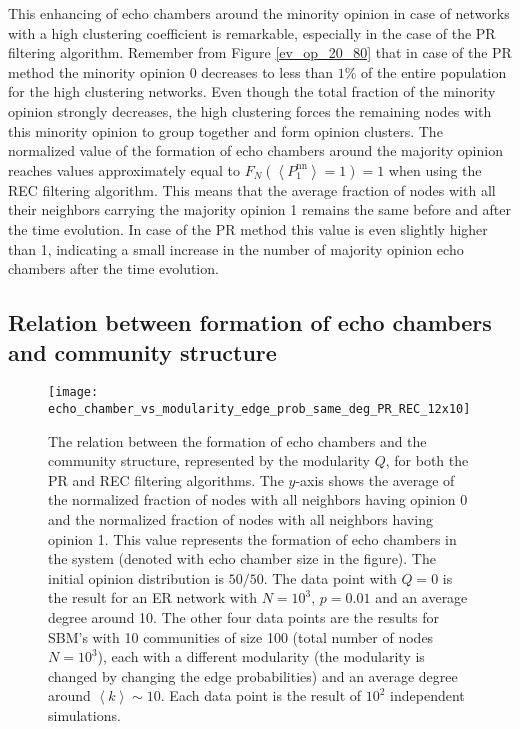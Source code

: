 \documentclass[11 pt , letterpaper , twoside , openright]{book}
\begin{document}
This enhancing of echo chambers around the minority opinion in case of networks with a high clustering coefficient is remarkable, especially in the case of the PR filtering algorithm. Remember from Figure \ref{ev_op_20_80} that in case of the PR method the minority opinion 0 decreases to less than $1 \%$ of the entire population for the high clustering networks. Even though the total fraction of the minority opinion strongly decreases, the high clustering forces the remaining nodes with this minority opinion to group together and form opinion clusters. The normalized value of the formation of echo chambers around the majority opinion reaches values approximately equal to $F_N(\left<P_1^{\text{nn}}\right> = 1) = 1$ when using the REC filtering algorithm. This means that the average fraction of nodes with all their neighbors carrying the majority opinion 1 remains the same before and after the time evolution. In case of the PR method this value is even slightly higher than 1, indicating a small increase in the number of majority opinion echo chambers after the time evolution. 


\subsection{Relation between formation of echo chambers and community structure}\label{echoVSmod}

\begin{figure}[H]
	\texttt{[image: echo\_chamber\_vs\_modularity\_edge\_prob\_same\_deg\_PR\_REC\_12x10]}
	\captionsetup{format=plain}
	\caption[Relation between the formation of echo chambers and community structure (modularity).]{The relation between the formation of echo chambers and the community structure, represented by the modularity $Q$, for both the PR and REC filtering algorithms. The $y$-axis shows the average of the normalized fraction of nodes with all neighbors having opinion 0 and the normalized fraction of nodes with all neighbors having opinion 1. This value represents the formation of echo chambers in the system (denoted with echo chamber size in the figure). The initial opinion distribution is $50/50$. The data point with $Q = 0$ is the result for an ER network with $N = 10^3$, $p = 0.01$ and an average degree around 10. The other four data points are the results for SBM's with 10 communities of size 100 (total number of nodes $N = 10^3$), each with a different modularity (the modularity is changed by changing the edge probabilities) and an average degree around $\left<k\right> \sim 10$. Each data point is the result of $10^2$ independent simulations.}
\label{echo_vs_mod}
\end{figure}
\end{document}
